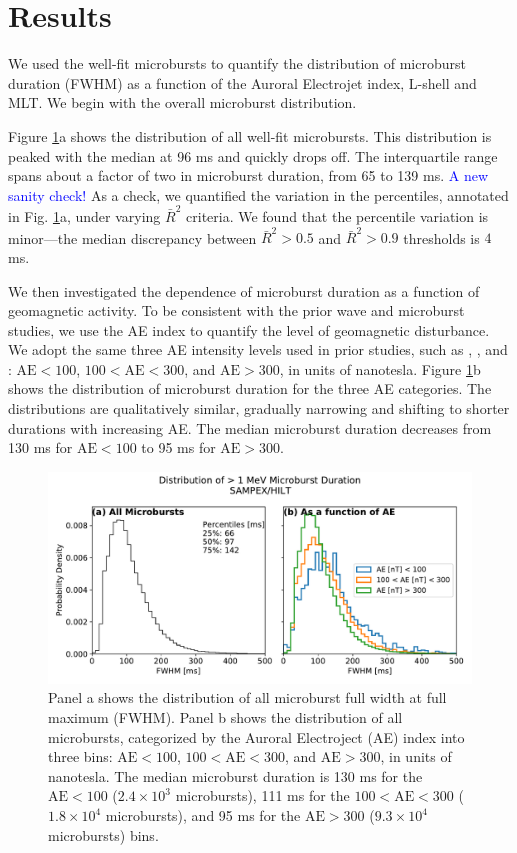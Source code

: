 \documentclass[draft]{agujournal2019}
\begin{document}
\section{Results}\label{results}
We used the well-fit microbursts to quantify the distribution of microburst duration (FWHM) as a function of the Auroral Electrojet index, L-shell and MLT. We begin with the overall microburst distribution.

Figure \ref{fig2}a shows the distribution of all well-fit microbursts. This distribution is peaked with the median at 96 ms and quickly drops off. The interquartile range spans about a factor of two in microburst duration, from 65 to 139 ms. \textcolor{blue}{A new sanity check!} As a check, we quantified the variation in the percentiles, annotated in Fig. \ref{fig2}a, under varying $\bar{R}^2$ criteria. We found that the percentile variation is minor---the median discrepancy between $\bar{R}^2 > 0.5$ and $\bar{R}^2 > 0.9$ thresholds is $4$ ms.

We then investigated the dependence of microburst duration as a function of geomagnetic activity. To be consistent with the prior wave and microburst studies, we use the AE index to quantify the level of geomagnetic disturbance. We adopt the same three AE intensity levels used in prior studies, such as , , and : $\mathrm{AE} < 100$, $100 < \mathrm{AE} < 300$, and $\mathrm{AE} > 300$, in units of nanotesla. Figure \ref{fig2}b shows the distribution of microburst duration for the three AE categories. The distributions are qualitatively similar, gradually narrowing and shifting to shorter durations with increasing AE. The median microburst duration decreases from 130 ms for $\mathrm{AE} < 100$ to 95 ms for $ \mathrm{AE} > 300$.

\begin{figure}
\noindent\includegraphics[width=\textwidth]{figures/fig2.pdf}
\caption{Panel a shows the distribution of all microburst full width at full maximum (FWHM). Panel b shows the distribution of all microbursts, categorized by the Auroral Electroject (AE) index into three bins: $\mathrm{AE} < 100$, $100 < \mathrm{AE} < 300$, and $\mathrm{AE} > 300$, in units of nanotesla. The median microburst duration is 130 ms for the $\mathrm{AE} < 100$ ($2.4\times 10^{3}$ microbursts), 111 ms for the $100 < \mathrm{AE} < 300$ ($1.8\times 10^{4}$ microbursts), and 95 ms for the $ \mathrm{AE} > 300$ ($9.3\times 10^{4}$ microbursts) bins.}
\label{fig2}
\end{figure}
\end{document}
